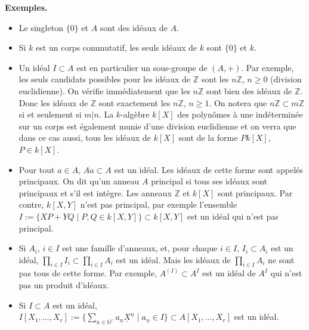 \documentclass[a4paper, oneside, 12pt]{book}
\theoremstyle{theoremeStyle} %
\theoremstyle{definition} %
\newcommand{\Z}{\mathbb{Z}}
\newcommand{\N}{\mathbb{N}}
\begin{document}
\textbf{Exemples.}
\begin{itemize}[leftmargin=* ,parsep=0cm,itemsep=0cm,topsep=0cm]
\item Le singleton  $\lbrace 0\rbrace$ et $A$ sont  des idéaux de $A$.
\item Si $k$ est un corps commutatif, les seuls idéaux de $k$ sont  $\lbrace 0\rbrace$ et $k$.
\item Un idéal $I\subset A$ est en particulier un sous-groupe de $(A,+)$. Par exemple, les seuls candidats possibles pour les idéaux de $\Z$ sont les $n\Z$, $n\geq 0$ (division euclidienne). On vérifie immédiatement que les $n\Z$ sont bien des idéaux de $\Z$. Donc les idéaux de $\Z$ sont exactement les $n\Z$, $n\geq 1$. On notera que $n\Z\subset m\Z$ si et seulement si $m|n$.  La $k$-algèbre $k[X]$ des polynômes à une indéterminée sur un corps est également munie d'une division euclidienne et on verra que dans ce cas aussi, tous les idéaux de $k[X]$ sont de la forme $Pk[X]$, $P\in k[X]$.
\item Pour tout $a\in A$, $Aa\subset A$ est un idéal. Les idéaux de cette forme sont appelés principaux. On dit qu'un anneau $A$ principal si tous ses idéaux sont principaux et s'il est intègre. Les anneaux $\Z$ et $k[X]$ sont principaux.  Par contre, $k[X,Y]$ n'est pas principal, par exemple l'ensemble $I:=\lbrace XP+YQ\;|\; P,Q\in k[X,Y]\rbrace\subset k[X,Y]$ est un idéal qui n'est pas principal.
\item Si $A_i$, $i\in I$ est une famille d'anneaux, et, pour chaque $i\in I$, $I_i\subset A_i$ est un idéal, $\prod_{i\in I}I_i\subset \prod_{i\in I}A_i$ est un idéal. Mais les idéaux de $\prod_{i\in I}A_i$ ne sont pas tous de cette forme. Par exemple, $A^{(I)}\subset A^I$ est un idéal de $A^I$ qui n'est pas un produit d'idéaux.
\item Si $I\subset A$ est un idéal, $I[X_1,\dots, X_r]:=\lbrace\sum_{\underline{n}\in \N^r}a_{\underline{n}}\underline{X}^{\underline{n}}\;|\; a_{\underline{n}}\in I \rbrace \subset A[X_1,\dots,X_r]$ est un idéal.

\end{itemize}
\end{document}
